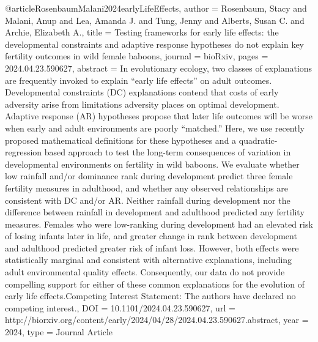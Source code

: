 {{@article{RosenbaumMalani2024earlyLifeEffects,
   author = {Rosenbaum, Stacy and Malani, Anup and Lea, Amanda J. and Tung, Jenny and Alberts, Susan C. and Archie, Elizabeth A.},
   title = {Testing frameworks for early life effects: the developmental constraints and adaptive response hypotheses do not explain key fertility outcomes in wild female baboons},
   journal = {bioRxiv},
   pages = {2024.04.23.590627},
   abstract = {In evolutionary ecology, two classes of explanations are frequently invoked to explain “early life effects” on adult outcomes. Developmental constraints (DC) explanations contend that costs of early adversity arise from limitations adversity places on optimal development. Adaptive response (AR) hypotheses propose that later life outcomes will be worse when early and adult environments are poorly “matched.” Here, we use recently proposed mathematical definitions for these hypotheses and a quadratic-regression based approach to test the long-term consequences of variation in developmental environments on fertility in wild baboons. We evaluate whether low rainfall and/or dominance rank during development predict three female fertility measures in adulthood, and whether any observed relationships are consistent with DC and/or AR. Neither rainfall during development nor the difference between rainfall in development and adulthood predicted any fertility measures. Females who were low-ranking during development had an elevated risk of losing infants later in life, and greater change in rank between development and adulthood predicted greater risk of infant loss. However, both effects were statistically marginal and consistent with alternative explanations, including adult environmental quality effects. Consequently, our data do not provide compelling support for either of these common explanations for the evolution of early life effects.Competing Interest Statement: The authors have declared no competing interest.},
   DOI = {10.1101/2024.04.23.590627},
   url = {http://biorxiv.org/content/early/2024/04/28/2024.04.23.590627.abstract},
   year = {2024},
   type = {Journal Article}
}

}}
